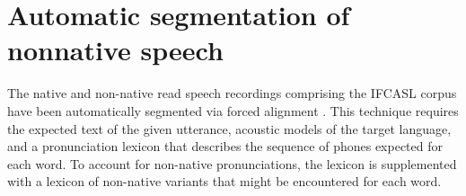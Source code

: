 \section{Automatic segmentation of nonnative speech}
\label{sec:diag:segmentation}


	
	
	

	
	The native and non-native read speech recordings comprising the IFCASL corpus \citep{Fauth2014,Trouvain2013} have been automatically segmented via forced alignment 
	\citep{Fohr1996,Mesbahi2011}.
	This technique requires 
	the expected text of the given utterance, 
	acoustic models of the target language, and a pronunciation lexicon that describes the sequence of phones expected for each word. To account for non-native pronunciations, the lexicon is supplemented with a lexicon of non-native variants that might be encountered for each word. 
	

